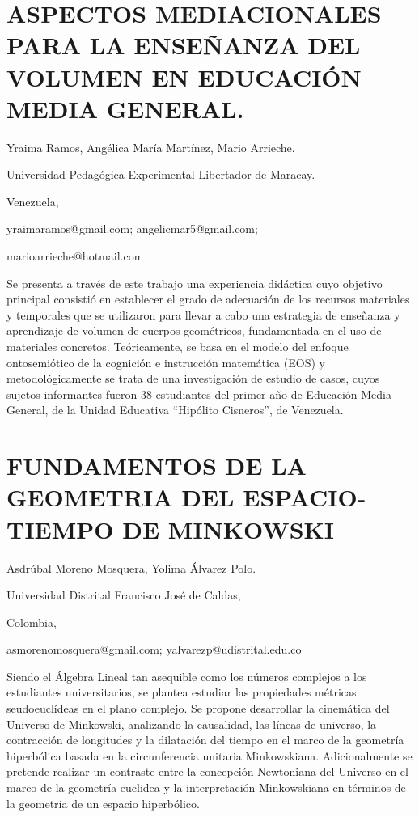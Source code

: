 \section{ASPECTOS MEDIACIONALES PARA LA ENSEÑANZA DEL VOLUMEN EN EDUCACIÓN
MEDIA GENERAL.}

\begin{datos}

Yraima Ramos, Angélica María Martínez, Mario Arrieche.

Universidad Pedagógica Experimental Libertador de Maracay.

Venezuela, 

yraimaramos@gmail.com; angelicmar5@gmail.com;

marioarrieche@hotmail.com

\end{datos}

Se presenta a través de este trabajo una experiencia didáctica cuyo
objetivo principal consistió en establecer el grado de adecuación
de los recursos materiales y temporales que se utilizaron para llevar
a cabo una estrategia de enseñanza y aprendizaje de volumen de cuerpos
geométricos, fundamentada en el uso de materiales concretos. Teóricamente,
se basa en el modelo del enfoque ontosemiótico de la cognición e instrucción
matemática (EOS) y metodológicamente se trata de una investigación
de estudio de casos, cuyos sujetos informantes fueron 38 estudiantes
del primer año de Educación Media General, de la Unidad Educativa
“Hipólito Cisneros”, de Venezuela. 


\section{FUNDAMENTOS DE LA GEOMETRIA DEL ESPACIO-TIEMPO DE MINKOWSKI }

\begin{datos}

Asdrúbal Moreno Mosquera, Yolima Álvarez Polo.

Universidad Distrital Francisco José de Caldas,

Colombia,

asmorenomosquera@gmail.com; yalvarezp@udistrital.edu.co

\end{datos}

Siendo el Álgebra Lineal tan asequible como los números complejos
a los estudiantes universitarios, se plantea estudiar las propiedades
métricas seudoeuclídeas en el plano complejo. Se propone desarrollar
la cinemática del Universo de Minkowski, analizando la causalidad,
las líneas de universo, la contracción de longitudes y la dilatación
del tiempo en el marco de la geometría hiperbólica basada en la circunferencia
unitaria Minkowskiana. Adicionalmente se pretende realizar un contraste
entre la concepción Newtoniana del Universo en el marco de la geometría
euclidea y la interpretación Minkowskiana en términos de la geometría
de un espacio hiperbólico.


